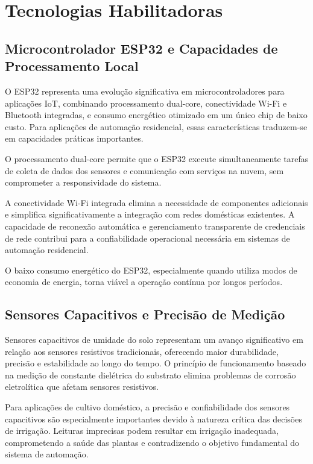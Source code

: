\documentclass[twoside,english,brazilian]{UNISINOSmonografia}
\begin{document}
\section{Tecnologias Habilitadoras}

\subsection{Microcontrolador ESP32 e Capacidades de Processamento Local}

O ESP32 representa uma evolução significativa em microcontroladores para aplicações IoT, combinando processamento dual-core, conectividade Wi-Fi e Bluetooth integradas, e consumo energético otimizado em um único chip de baixo custo. Para aplicações de automação residencial, essas características traduzem-se em capacidades práticas importantes.

O processamento dual-core permite que o ESP32 execute simultaneamente tarefas de coleta de dados dos sensores e comunicação com serviços na nuvem, sem comprometer a responsividade do sistema. 

A conectividade Wi-Fi integrada elimina a necessidade de componentes adicionais e simplifica significativamente a integração com redes domésticas existentes. A capacidade de reconexão automática e gerenciamento transparente de credenciais de rede contribui para a confiabilidade operacional necessária em sistemas de automação residencial.

O baixo consumo energético do ESP32, especialmente quando utiliza modos de economia de energia, torna viável a operação contínua por longos períodos. 

\subsection{Sensores Capacitivos e Precisão de Medição}

Sensores capacitivos de umidade do solo representam um avanço significativo em relação aos sensores resistivos tradicionais, oferecendo maior durabilidade, precisão e estabilidade ao longo do tempo. O princípio de funcionamento baseado na medição de constante dielétrica do substrato elimina problemas de corrosão eletrolítica que afetam sensores resistivos.

Para aplicações de cultivo doméstico, a precisão e confiabilidade dos sensores capacitivos são especialmente importantes devido à natureza crítica das decisões de irrigação. Leituras imprecisas podem resultar em irrigação inadequada, comprometendo a saúde das plantas e contradizendo o objetivo fundamental do sistema de automação.
\end{document}
